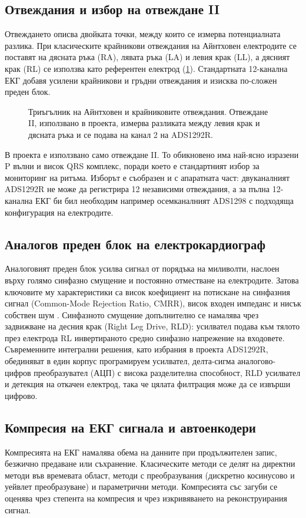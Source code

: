 \documentclass[12pt,a4paper]{article}
\begin{document}
\subsection{Отвеждания и избор на отвеждане II}
Отвеждането описва двойката точки, между които се измерва потенциалната разлика. При класическите крайникови отвеждания на Айнтховен електродите се поставят на дясната ръка (RA), лявата ръка (LA) и левия крак (LL), а дясният крак (RL) се използва като референтен електрод (\cref{fig:einthoven}). Стандартната 12-канална ЕКГ добавя усилени крайникови и гръдни отвеждания и изисква по-сложен преден блок.

\begin{figure}[htbp]
    \centering
    
    \caption{Триъгълник на Айнтховен и крайниковите отвеждания. Отвеждане II, използвано в проекта, измерва разликата между левия крак и дясната ръка и се подава на канал 2 на ADS1292R.}
    \label{fig:einthoven}
\end{figure}

В проекта е използвано само отвеждане II. То обикновено има най-ясно изразени P вълни и висок QRS комплекс, поради което е стандартният избор за мониторинг на ритъма. Изборът е съобразен и с апаратната част: двуканалният ADS1292R не може да регистрира 12 независими отвеждания, а за пълна 12-канална ЕКГ би бил необходим например осемканалният ADS1298 с подходяща конфигурация на електродите.

\subsection{Аналогов преден блок на електрокардиограф}
Аналоговият преден блок усилва сигнал от порядъка на миливолти, наслоен върху голямо синфазно смущение и постоянно отместване на електродите. Затова ключовите му характеристики са висок коефициент на потискане на синфазния сигнал (Common-Mode Rejection Ratio, CMRR), висок входен импеданс и нисък собствен шум \cite{webster2010medical}. Синфазното смущение допълнително се намалява чрез задвижване на десния крак (Right Leg Drive, RLD): усилвател подава към тялото през електрода RL инвертираното средно синфазно напрежение на входовете. Съвременните интегрални решения, като избрания в проекта ADS1292R, обединяват в един корпус програмируем усилвател, делта-сигма аналогово-цифров преобразувател (АЦП) с висока разделителна способност, RLD усилвател и детекция на откачен електрод, така че цялата филтрация може да се извърши цифрово.

\subsection{Компресия на ЕКГ сигнала и автоенкодери}
Компресията на ЕКГ намалява обема на данните при продължителен запис, безжично предаване или съхранение. Класическите методи се делят на директни методи във времевата област, методи с преобразувания (дискретно косинусово и уейвлет преобразуване) и параметрични методи. Компресията със загуби се оценява чрез степента на компресия и чрез изкривяването на реконструирания сигнал.
\end{document}
